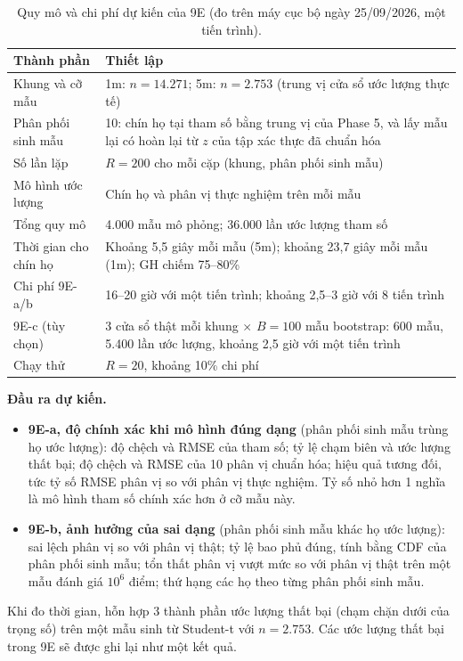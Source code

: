 \documentclass[11pt,a4paper]{article}
\begin{document}
\begin{table}[h]
\centering
\small
\caption{Quy mô và chi phí dự kiến của 9E (đo trên máy cục bộ ngày 25/09/2026, một tiến trình).}
\begin{tabularx}{\linewidth}{lX}
\toprule
Thành phần & Thiết lập \\
\midrule
Khung và cỡ mẫu & 1m: $n=14.271$; 5m: $n=2.753$ (trung vị cửa sổ ước lượng thực tế) \\
Phân phối sinh mẫu & 10: chín họ tại tham số bằng trung vị của Phase 5, và lấy mẫu lại có hoàn lại từ $z$ của tập xác thực đã chuẩn hóa \\
Số lần lặp & $R=200$ cho mỗi cặp (khung, phân phối sinh mẫu) \\
Mô hình ước lượng & Chín họ và phân vị thực nghiệm trên mỗi mẫu \\
Tổng quy mô & 4.000 mẫu mô phỏng; 36.000 lần ước lượng tham số \\
Thời gian cho chín họ & Khoảng 5,5 giây mỗi mẫu (5m); khoảng 23,7 giây mỗi mẫu (1m); GH chiếm 75--80\% \\
Chi phí 9E-a/b & 16--20 giờ với một tiến trình; khoảng 2,5--3 giờ với 8 tiến trình \\
9E-c (tùy chọn) & 3 cửa sổ thật mỗi khung $\times$ $B=100$ mẫu bootstrap: 600 mẫu, 5.400 lần ước lượng, khoảng 2,5 giờ với một tiến trình \\
Chạy thử & $R=20$, khoảng 10\% chi phí \\
\bottomrule
\end{tabularx}
\end{table}

\textbf{Đầu ra dự kiến.}
\begin{itemize}[nosep]
\item \textbf{9E-a, độ chính xác khi mô hình đúng dạng} (phân phối sinh mẫu trùng họ ước lượng): độ chệch và RMSE của tham số; tỷ lệ chạm biên và ước lượng thất bại; độ chệch và RMSE của 10 phân vị chuẩn hóa; hiệu quả tương đối, tức tỷ số RMSE phân vị so với phân vị thực nghiệm. Tỷ số nhỏ hơn 1 nghĩa là mô hình tham số chính xác hơn ở cỡ mẫu này.
\item \textbf{9E-b, ảnh hưởng của sai dạng} (phân phối sinh mẫu khác họ ước lượng): sai lệch phân vị so với phân vị thật; tỷ lệ bao phủ đúng, tính bằng CDF của phân phối sinh mẫu; tổn thất phân vị vượt mức so với phân vị thật trên một mẫu đánh giá $10^6$ điểm; thứ hạng các họ theo từng phân phối sinh mẫu.
\end{itemize}

Khi đo thời gian, hỗn hợp 3 thành phần ước lượng thất bại (chạm chặn dưới của trọng số) trên một mẫu sinh từ Student-t với $n=2.753$. Các ước lượng thất bại trong 9E sẽ được ghi lại như một kết quả.
\end{document}
